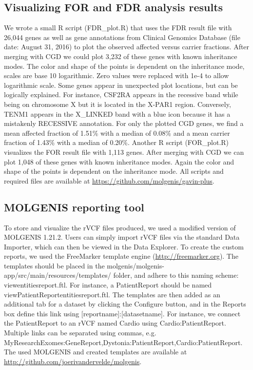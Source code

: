 \subsection{Visualizing FOR and FDR analysis results}
We wrote a small R script (FDR\_\-plot.R) that uses the FDR result file with 26,044 genes as well as gene annotations from Clinical Genomics Database\cite{Solomon_2013} (file date: August 31, 2016) to plot the observed affected versus carrier fractions.
After merging with CGD we could plot 3,232 of these genes with known inheritance modes.
The color and shape of the points is dependent on the inheritance mode, scales are base 10 logarithmic.
Zero values were replaced with 1e-4 to allow logarithmic scale.
Some genes appear in unexpected plot locations, but can be logically explained.
For instance, CSF2RA appears in the recessive band while being on chromosome X but it is located in the X-PAR1 region.
Conversely, TENM1 appears in the X\_\-LINKED band with a blue icon because it has a mistakenly RECESSIVE annotation.
For only the plotted CGD genes, we find a mean affected fraction of 1.51\% with a median of 0.08\% and a mean carrier fraction of 1.43\% with a median of 0.20\%.
Another R script (FOR\_\-plot.R) visualizes the FOR result file with 1,113 genes.
After merging with CGD we can plot 1,048 of these genes with known inheritance modes.
Again the color and shape of the points is dependent on the inheritance mode.
All scripts and required files are available at \url{https://github.com/molgenis/gavin-plus}.

\subsection{MOLGENIS reporting tool}
To store and visualize the rVCF files produced, we used a modified version of MOLGENIS 1.21.2\cite{Swertz_2010a}.
Users can simply import rVCF files via the standard Data Importer, which can then be viewed in the Data Explorer.
To create the custom reports, we used the Free\-Marker template engine (\url{http://freemarker.org}).
The templates should be placed in the mol\-gen\-is/mol\-gen\-is-app/\-src/\-main/\-resources/\-templates/ folder, and adhere to this naming scheme: view\-entities\-report.ftl.
For instance, a Patient\-Report should be named view\-Patient\-Report\-entities\-report.ftl.
The templates are then added as an additional tab for a dataset by clicking the Configure button, and in the Reports box define this link using [report\-name]:[data\-set\-name].
For instance, we connect the Patient\-Report to an rVCF named Cardio using Cardio:\-Patient\-Report.
Multiple links can be separated using commas, e.g. My\-Research\-Exomes:\-Gene\-Report,\-Dystonia:Patient\-Report,\-Cardio:\-Patient\-Report.
The used MOLGENIS and created templates are available at \url{http://github.com/joerivandervelde/molgenis}.

